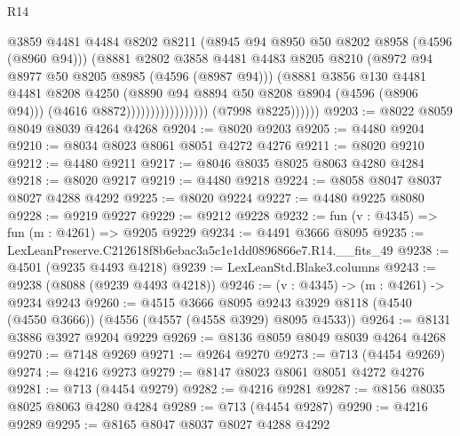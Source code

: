 \begin{lexlean}{R14}
\begin{coremodule}
                                          @3859
                                          @4481
                                          @4484
                                          @8202
                                          @8211
                                          (@8945 @94 @8950 @50 @8202 @8958 (@4596 (@8960 @94)))
                                          (@8881
                                            @2802
                                            @3858
                                            @4481
                                            @4483
                                            @8205
                                            @8210
                                            (@8972 @94 @8977 @50 @8205 @8985 (@4596 (@8987 @94)))
                                            (@8881
                                              @3856
                                              @130
                                              @4481
                                              @4481
                                              @8208
                                              @4250
                                              (@8890 @94 @8894 @50 @8208 @8904 (@4596 (@8906 @94)))
                                              (@4616 @8872)))))))))))))))))
              (@7998 @8225))))))
@9203 := @8022 @8059 @8049 @8039 @4264 @4268
@9204 := @8020 @9203
@9205 := @4480 @9204
@9210 := @8034 @8023 @8061 @8051 @4272 @4276
@9211 := @8020 @9210
@9212 := @4480 @9211
@9217 := @8046 @8035 @8025 @8063 @4280 @4284
@9218 := @8020 @9217
@9219 := @4480 @9218
@9224 := @8058 @8047 @8037 @8027 @4288 @4292
@9225 := @8020 @9224
@9227 := @4480 @9225 @8080
@9228 := @9219 @9227
@9229 := @9212 @9228
@9232 := fun (v : @4345) => fun (m : @4261) => @9205 @9229
@9234 := @4491 @3666 @8095
@9235 := LexLeanPreserve.C212618f8b6ebac3a5c1e1dd0896866e7.R14.__fits_49
@9238 := @4501 (@9235 @4493 @4218)
@9239 := LexLeanStd.Blake3.columns
@9243 := @9238 (@8088 (@9239 @4493 @4218))
@9246 := (v : @4345) -> (m : @4261) -> @9234 @9243
@9260 := @4515
    @3666
    @8095
    @9243
    @3929
    @8118
    (@4540 (@4550 @3666))
    (@4556 (@4557 (@4558 @3929) @8095 @4533))
@9264 := @8131 @3886 @3927 @9204 @9229
@9269 := @8136 @8059 @8049 @8039 @4264 @4268
@9270 := @7148 @9269
@9271 := @9264 @9270
@9273 := @713 (@4454 @9269)
@9274 := @4216 @9273
@9279 := @8147 @8023 @8061 @8051 @4272 @4276
@9281 := @713 (@4454 @9279)
@9282 := @4216 @9281
@9287 := @8156 @8035 @8025 @8063 @4280 @4284
@9289 := @713 (@4454 @9287)
@9290 := @4216 @9289
@9295 := @8165 @8047 @8037 @8027 @4288 @4292

\end{coremodule}
\end{lexlean}
